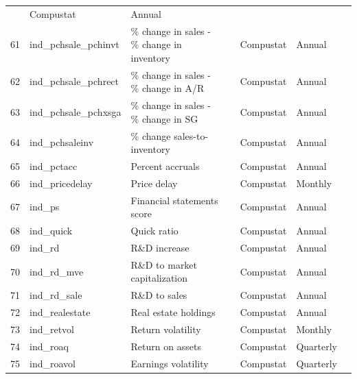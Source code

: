 \documentclass[11pt, a4paper, table]{article}
\begin{document}
\begin{landscape}
\begin{center}
\begin{longtable}{lllllll}
				\cite{ou_financial_1989} & Compustat & Annual \\
			61 & ind\_pchsale\_pchinvt\footnotemark[\value{footnote}] & \% change in sales - \% change in inventory & 
				\cite{abarbanell_abnormal_1998} & Compustat & Annual \\
			62 & ind\_pchsale\_pchrect\footnotemark[\value{footnote}] & \% change in sales - \% change in A/R & 
				\cite{abarbanell_abnormal_1998} & Compustat & Annual \\
			63 & ind\_pchsale\_pchxsga\footnotemark[\value{footnote}] & \% change in sales - \% change in SG & 
				\cite{abarbanell_abnormal_1998} & Compustat & Annual \\
			64 & ind\_pchsaleinv\footnotemark[\value{footnote}] & \% change sales-to-inventory & 
				\cite{ou_financial_1989} & Compustat & Annual \\
			65 & ind\_pctacc\footnotemark[\value{footnote}] & Percent accruals & 
				\cite{hafzalla_percent_2011} & Compustat & Annual \\
			66 & ind\_pricedelay & Price delay & 
				\cite{hou_market_2005} & Compustat & Monthly \\
			67 & ind\_ps & Financial statements score & 
				\cite{piotroski_value_2000} & Compustat & Annual \\
			68 & ind\_quick & Quick ratio & 
				\cite{ou_financial_1989} & Compustat & Annual \\
			69 & ind\_rd & R\&D increase & 
				\cite{eberhart_examination_2004} & Compustat & Annual \\
			70 & ind\_rd\_mve\footnotemark[\value{footnote}] & R\&D to market capitalization & 
				\cite{guo_explaining_2006} & Compustat & Annual \\
			71 & ind\_rd\_sale\footnotemark[\value{footnote}] & R\&D to sales & 
				\cite{guo_explaining_2006} & Compustat & Annual \\
			72 & ind\_realestate\footnotemark[\value{footnote}] & Real estate holdings & 
				\cite{tuzel_corporate_2010} & Compustat & Annual \\
			73 & ind\_retvol & Return volatility & 
				\cite{ang_cross-section_2006} & Compustat & Monthly \\
			74 & ind\_roaq & Return on assets & 
				\cite{balakrishnan_post_2010} & Compustat & Quarterly \\
			75 & ind\_roavol\footnotemark[\value{footnote}] & Earnings volatility & 
				\cite{francis_costs_2004} & Compustat & Quarterly \\

\end{longtable}
\end{center}
\end{landscape}
\end{document}
